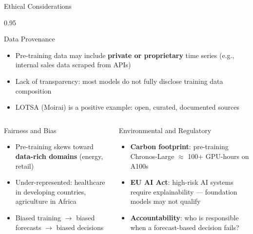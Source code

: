 \documentclass[9pt, aspectratio=169, t]{beamer}
\begin{document}
\begin{frame}{Ethical Considerations}
    \begin{cminipage}{0.95\textwidth}
    \vspace{-2mm}
    \begin{block}{Data Provenance}
        {\small
        \begin{itemize}\setlength{\itemsep}{0pt}
            \item Pre-training data may include \textbf{private or proprietary} time series (e.g., internal sales data scraped from APIs)
            \item Lack of transparency: most models do not fully disclose training data composition
            \item LOTSA (Moirai) is a positive example: open, curated, documented sources
        \end{itemize}
        }
    \end{block}
    \vspace{-2mm}
    \begin{columns}[T]
        \begin{alertblock}{Fairness and Bias}
            {\scriptsize
            \begin{itemize}\setlength{\itemsep}{0pt}
                \item Pre-training skews toward \textbf{data-rich domains} (energy, retail)
                \item Under-represented: healthcare in developing countries, agriculture in Africa
                \item Biased training $\to$ biased forecasts $\to$ biased decisions
            \end{itemize}
            }
        \end{alertblock}

        \begin{alertblock}{Environmental and Regulatory}
            {\scriptsize
            \begin{itemize}\setlength{\itemsep}{0pt}
                \item \textbf{Carbon footprint}: pre-training Chronos-Large $\approx$ 100+ GPU-hours on A100s
                \item \textbf{EU AI Act}: high-risk AI systems require explainability --- foundation models may not qualify
                \item \textbf{Accountability}: who is responsible when a forecast-based decision fails?
            \end{itemize}
            }
        \end{alertblock}
    \end{columns}
    \end{cminipage}
\end{frame}
\end{document}
